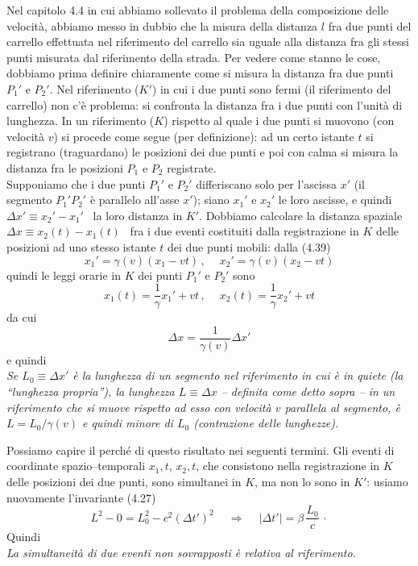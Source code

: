 Nel capitolo 4.4 in cui abbiamo sollevato il problema della composizione delle
velocit\`a, abbiamo messo in dubbio che la misura della distanza $l$ fra due
punti del carrello effettuata nel riferimento del carrello sia uguale alla
distanza fra gli stessi punti misurata dal riferimento della strada. Per vedere
come stanno le cose, dobbiamo prima definire chiaramente come si misura la
distanza fra due punti $P_1'$ e $P_2'$. Nel riferimento ($K'$) in cui i due
punti sono fermi (il riferimento del carrello) non c'\`e problema: si confronta
la distanza fra i due punti con l'unit\`a di lunghezza. In un riferimento ($K$)
rispetto al quale i due punti si muovono (con velocit\`a $v$) si procede come
segue (per definizione): ad un certo istante $t$ si registrano (traguardano) le
posizioni dei due punti e poi con calma si misura la distanza fra le posizioni
$P_1$ e $P_2$ registrate.\\
Supponiamo che i due punti $P_1'$ e $P_2'$ differiscano solo per l'ascissa $x'$
(il segmento $P_1'P_2'$ \`e parallelo all'asse $x'$); siano $x_1'$ e $x_2'$ le
loro ascisse, e quindi \ $\Delta x'\equiv x_2'-x_1'$ \ la loro distanza in $K'$.
Dobbiamo calcolare la distanza spaziale \ $\Delta x\equiv x_2(t)-x_1(t)$ \ fra i
due eventi costituiti dalla registrazione in $K$ delle posizioni ad uno stesso
istante $t$ dei due punti mobili: dalla (4.39)
\begin{equation}
  x_1'=\gamma(v)(x_1-vt)\,,\quad\ x_2'=\gamma(v)(x_2-vt)
  \tag{4.45}
\end{equation}
quindi le leggi orarie in $K$ dei punti $P_1'$ e $P_2'$ sono
\begin{equation}
  x_1(t)=\frac1\gamma x_1'+vt\,,\quad\ x_2(t)=\frac1\gamma x_2'+vt
  \tag{4.46}
\end{equation}
da cui
\begin{equation}
  \Delta x=\frac{1}{\gamma(v)}\Delta x'
  \tag{4.47}
\end{equation}
e quindi\\
\textit{Se $L_0\equiv\Delta x'$ \`e la lunghezza di un segmento nel riferimento
in cui \`e in quiete (la ``lunghezza propria''), la lunghezza $L\equiv\Delta x$
-- definita come detto sopra -- in un riferimento che si muove rispetto ad esso
con velocit\`a $v$ parallela al segmento, \`e $L=L_0/\gamma(v)$ e quindi minore
di $L_0$ (contrazione delle lunghezze).}

Possiamo capire il perch\'e di questo risultato nei seguenti termini. Gli eventi
di coordinate spazio--temporali $x_1,t$, $x_2,t$, che consistono nella
registrazione in $K$ delle posizioni dei due punti, sono simultanei in $K$, ma
non lo sono in $K'$: usiamo nuovamente l'invariante (4.27)
\begin{equation}
  L^2-0=L_0^2-c^2(\Delta t')^2
  \quad\ \Rightarrow\quad\ |\Delta t'|=\beta\,\frac{L_0}{c}\,\cdot
  \tag{4.48}
\end{equation}
Quindi\\
\textit{La simultaneit\`a di due eventi non sovrapposti \`e relativa al
riferimento.}

